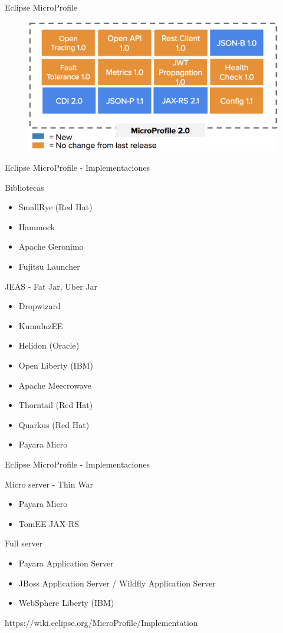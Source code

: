 \documentclass{beamer}
\begin{document}
\begin{frame}{Eclipse MicroProfile}
\begin{figure}
	\centering
	\includegraphics[width=\linewidth]{Images/mp5}
\end{figure}
\end{frame}


\begin{frame}{Eclipse MicroProfile - Implementaciones}

Bibliotecas
\begin{itemize}
	\item SmallRye (Red Hat)
	\item Hammock
	\item Apache Geronimo
	\item Fujitsu Launcher
\end{itemize}
	
JEAS - Fat Jar, Uber Jar
\begin{itemize}
	\item Dropwizard
	\item KumuluzEE
	\item Helidon (Oracle)
	\item Open Liberty (IBM)
	\item Apache Meecrowave
	\item Thorntail (Red Hat)
	\item Quarkus (Red Hat)
	\item Payara Micro
\end{itemize}
\end{frame}
\begin{frame}{Eclipse MicroProfile - Implementaciones}

Micro server - Thin War
\begin{itemize}
	\item Payara Micro
	\item TomEE JAX-RS
\end{itemize}

Full server
\begin{itemize}
	\item Payara Application Server
	\item JBoss Application Server / Wildfly Application Server
	\item WebSphere Liberty (IBM)
\end{itemize}

https://wiki.eclipse.org/MicroProfile/Implementation
\end{frame}
\end{document}
